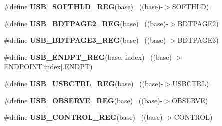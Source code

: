 \begin{DoxyCompactItemize}
\item 
\hypertarget{group___u_s_b___register___accessor___macros_ga09aac565b7f5e742a25732100fbf8889}{}\#define {\bfseries U\+S\+B\+\_\+\+S\+O\+F\+T\+H\+L\+D\+\_\+\+R\+E\+G}(base)                                    ~((base)-\/$>$S\+O\+F\+T\+H\+L\+D)\label{group___u_s_b___register___accessor___macros_ga09aac565b7f5e742a25732100fbf8889}

\item 
\hypertarget{group___u_s_b___register___accessor___macros_gaa6efc82627e2983372a9cafa08d3e646}{}\#define {\bfseries U\+S\+B\+\_\+\+B\+D\+T\+P\+A\+G\+E2\+\_\+\+R\+E\+G}(base)                                  ~((base)-\/$>$B\+D\+T\+P\+A\+G\+E2)\label{group___u_s_b___register___accessor___macros_gaa6efc82627e2983372a9cafa08d3e646}

\item 
\hypertarget{group___u_s_b___register___accessor___macros_ga2b3f2b53d240a5769557b3bf86c2e3ea}{}\#define {\bfseries U\+S\+B\+\_\+\+B\+D\+T\+P\+A\+G\+E3\+\_\+\+R\+E\+G}(base)                                  ~((base)-\/$>$B\+D\+T\+P\+A\+G\+E3)\label{group___u_s_b___register___accessor___macros_ga2b3f2b53d240a5769557b3bf86c2e3ea}

\item 
\hypertarget{group___u_s_b___register___accessor___macros_ga2d64e95d192db6bf8f035cc6a7cf48d6}{}\#define {\bfseries U\+S\+B\+\_\+\+E\+N\+D\+P\+T\+\_\+\+R\+E\+G}(base,  index)                            ~((base)-\/$>$E\+N\+D\+P\+O\+I\+N\+T\mbox{[}index\mbox{]}.E\+N\+D\+P\+T)\label{group___u_s_b___register___accessor___macros_ga2d64e95d192db6bf8f035cc6a7cf48d6}

\item 
\hypertarget{group___u_s_b___register___accessor___macros_ga73ac0c0c60bf6fd8e2ed9dee3f2aa436}{}\#define {\bfseries U\+S\+B\+\_\+\+U\+S\+B\+C\+T\+R\+L\+\_\+\+R\+E\+G}(base)                                    ~((base)-\/$>$U\+S\+B\+C\+T\+R\+L)\label{group___u_s_b___register___accessor___macros_ga73ac0c0c60bf6fd8e2ed9dee3f2aa436}

\item 
\hypertarget{group___u_s_b___register___accessor___macros_ga2ee1aa6fd76b49402bf4a1799687e944}{}\#define {\bfseries U\+S\+B\+\_\+\+O\+B\+S\+E\+R\+V\+E\+\_\+\+R\+E\+G}(base)                                    ~((base)-\/$>$O\+B\+S\+E\+R\+V\+E)\label{group___u_s_b___register___accessor___macros_ga2ee1aa6fd76b49402bf4a1799687e944}

\item 
\hypertarget{group___u_s_b___register___accessor___macros_ga9c4c4c5d0d19933e8c0ab5ac5dfe48a5}{}\#define {\bfseries U\+S\+B\+\_\+\+C\+O\+N\+T\+R\+O\+L\+\_\+\+R\+E\+G}(base)                                    ~((base)-\/$>$C\+O\+N\+T\+R\+O\+L)\label{group___u_s_b___register___accessor___macros_ga9c4c4c5d0d19933e8c0ab5ac5dfe48a5}


\end{DoxyCompactItemize}
